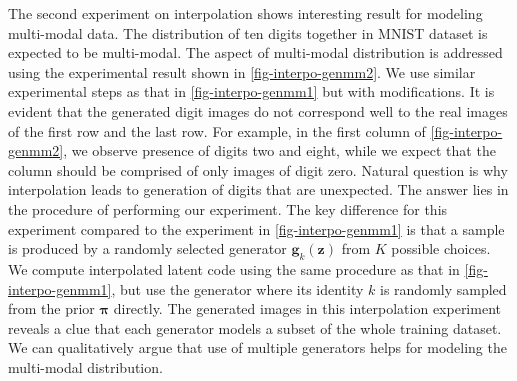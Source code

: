 The second experiment on interpolation shows interesting result for
modeling multi-modal data. The distribution of ten digits together in
MNIST dataset is expected to be multi-modal. The aspect of multi-modal
distribution is addressed using the experimental result shown in
\autoref{fig-interpo-genmm2}. We use similar experimental steps
as that in \autoref{fig-interpo-genmm1} but with modifications. It
is evident that the generated digit images do not correspond well to
the real images of the first row and the last row. For example, in the
first column of \autoref{fig-interpo-genmm2}, we observe
presence of digits two and eight, while we expect that the
column should be comprised of only images of digit zero. Natural
question is why interpolation leads to generation of digits that are
unexpected. The answer lies in the procedure of performing our
experiment. The key difference for this experiment compared to the
experiment in \autoref{fig-interpo-genmm1} is that a sample is
produced by a randomly selected generator $\bm{g}_k(\bm{z})$ from $K$
possible choices. We compute interpolated latent code using the same
procedure as that in \autoref{fig-interpo-genmm1}, but use the generator where its identity $k$ is randomly sampled from the prior $\bm{\pi}$ directly. The generated images in this interpolation experiment reveals a clue that each generator models a subset of the whole training dataset. We can qualitatively argue that use of multiple generators helps for modeling the multi-modal distribution.  

